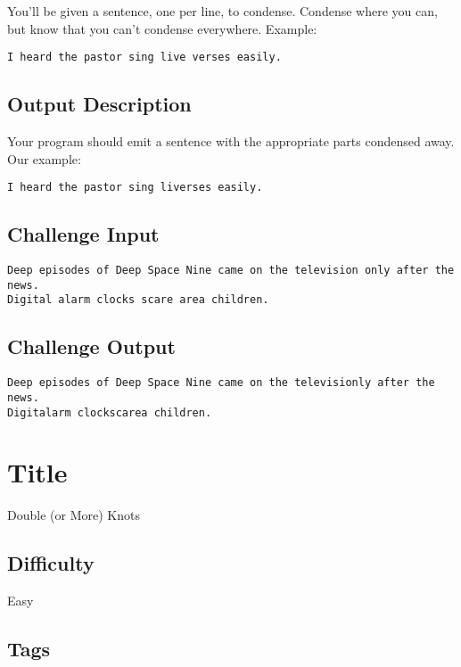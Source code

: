 You'll be given a sentence, one per line, to condense. Condense where
you can, but know that you can't condense everywhere. Example:

\begin{verbatim}
I heard the pastor sing live verses easily.
\end{verbatim}

\subsection{Output Description}\label{output-description-15}

Your program should emit a sentence with the appropriate parts condensed
away. Our example:

\begin{verbatim}
I heard the pastor sing liverses easily. 
\end{verbatim}

\subsection{Challenge Input}\label{challenge-input-15}

\begin{verbatim}
Deep episodes of Deep Space Nine came on the television only after the news.
Digital alarm clocks scare area children.
\end{verbatim}

\subsection{Challenge Output}\label{challenge-output-12}

\begin{verbatim}
Deep episodes of Deep Space Nine came on the televisionly after the news.
Digitalarm clockscarea children.
\end{verbatim}

\section{Title}\label{title-22}

Double (or More) Knots

\subsection{Difficulty}\label{difficulty-21}

Easy

\subsection{Tags}\label{tags-22}

